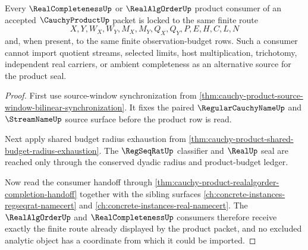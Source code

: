 \begin{theorem}
\label{thm:cauchy-product-real-completion-consumer-lock}
Every $\RealCompletenessUp$ or $\RealAlgOrderUp$ product consumer of an accepted $\CauchyProductUp$ packet is locked to the same finite route
$$
X,Y,W_X,W_Y,M_X,M_Y,Q_X,Q_Y,P,E,H,C,L,N
$$
and, when present, to the same finite observation-budget rows. Such a consumer cannot import quotient streams, selected limits, host multiplication, trichotomy, independent real carriers, or ambient completeness as an alternative source for the product seal.
\end{theorem}
\begin{proof}
First use source-window synchronization from \autoref{thm:cauchy-product-source-window-bilinear-synchronization}. It fixes the paired $\RegularCauchyNameUp$ and $\StreamNameUp$ source surface before the product row is read.

Next apply shared budget radius exhaustion from \autoref{thm:cauchy-product-shared-budget-radius-exhaustion}. The $\RegSeqRatUp$ classifier and $\RealUp$ seal are reached only through the conserved dyadic radius and product-budget ledger.

Now read the consumer handoff through \autoref{thm:cauchy-product-realalgorder-completion-handoff} together with the sibling surfaces \autoref{ch:concrete-instances-regseqrat-namecert} and \autoref{ch:concrete-instances-real-namecert}. The $\RealAlgOrderUp$ and $\RealCompletenessUp$ consumers therefore receive exactly the finite route already displayed by the product packet, and no excluded analytic object has a coordinate from which it could be imported.
\end{proof}

